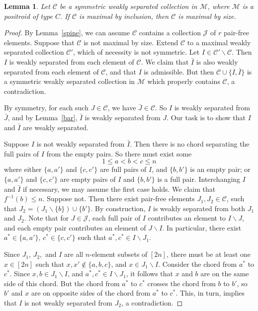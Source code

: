 \documentclass[10pt]{amsart}
\newtheorem{lemm}[theo]{Lemma}
\theoremstyle{definition}
\begin{document}
\begin{lemm}\label{ifspine} 
Let $\mathcal{C}$ be a symmetric weakly separated collection in $\mathcal{M}$, where $\mathcal{M}$ is a positroid of type $C$. If $\mathcal{C}$ is maximal by inclusion, then $\mathcal{C}$ is maximal by size.
\end{lemm}

\begin{proof}
By Lemma~\ref{spine}, we can assume $\mathcal{C}$ contains a collection $\mathcal{J}$ of $r$ pair-free elements. Suppose that $\mathcal{C}$ is not maximal by size. Extend $\mathcal{C}$ to a maximal weakly separated collection $\mathcal{C}'$, which of necessity is not symmetric. Let $I \in \mathcal{C}' \backslash \mathcal{C}.$ Then $I$ is weakly separated from each element of $\mathcal{C}$. We claim that $\bar{I}$ is also weakly separated from each element of $\mathcal{C}$, and that $I$ is admissible. But then $\mathcal{C} \cup \{I,\bar{I}\}$ is a symmetric weakly separated collection in $\mathcal{M}$ which properly contains $\mathcal{C}$, a contradiction.

By symmetry, for each such $J \in \mathcal{C}$, we have $\bar{J} \in \mathcal{C}$. So $I$ is weakly separated from~$\bar{J}$, and by Lemma~\ref{bar}, $\bar{I}$ is weakly separated from $J$. Our task is to show that $I$ and $\bar{I}$ are weakly separated. 

Suppose $I$ is not weakly separated from $\bar{I}$. Then there is no chord separating the full pairs of $I$ from the empty pairs. So there must exist some
\[1 \leq a < b < c \leq n\]
where either $\{a,a'\}$ and $\{c,c'\}$ are full pairs of $I$, and $\{b,b'\}$ is an empty pair; or $\{a,a'\}$ and $\{c,c'\}$ are empty pairs of $I$ and $\{b,b'\}$ is a full pair. Interchanging $I$ and $\bar{I}$ if necessary, we may assume the first case holds. We claim that $f^{-1}(b) \leq n$. Suppose not. Then there exist pair-free elements $J_1,J_2 \in \mathcal{C}$, such that $J_2 =( J_1 \backslash \{b\}) \cup \{b'\}$. By construction, $I$ is weakly separated from both $J_1$ and $J_2$. Note that for $J \in \mathcal{J}$, each full pair of $I$ contributes an element to $I \backslash J$, and each empty pair contributes an element of $J\backslash I$. In particular, there exist $a^* \in \{a,a'\}$, $c^* \in \{c,c'\}$ such that $a^*, c^* \in I \backslash J_1$.

Since $J_1$, $J_2,$ and $I$ are all $n$-element subsets of $[2n]$, there must be at least one $x \in [2n]$ such that $x,x' \not\in \{a,b,c\}$, and $x \in J_1 \backslash I$. Consider the chord from $a^*$ to $c^*$. Since $x,b \in J_1 \backslash I$, and $a^*, c^* \in I \backslash J_1$, it follows that $x$ and $b$ are on the same side of this chord. But the chord from $a^*$ to $c^*$ crosses the chord from $b$ to $b'$, so $b'$ and $x$ are on opposite sides of the chord from $a^*$ to $c^*$. This, in turn, implies that $I$ is not weakly separated from $J_2$, a contradiction.


\end{proof}
\end{document}
